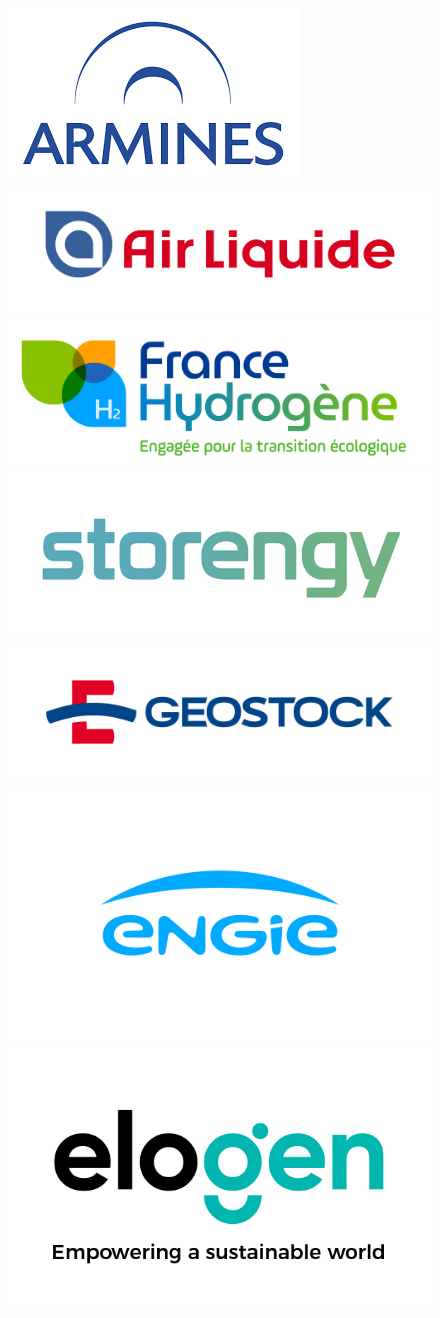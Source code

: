 \documentclass[11pt,french,a4paper]{article}
\begin{document}
\begin{figure}[!h]
	\includegraphics[width=.30\textwidth]{image/frontpage/logo_ARMINES.PNG}\hfill	
	\includegraphics[width=.30\textwidth]{image/frontpage/logo_air_liquide.jpg} \hfill
	\includegraphics[width=.30\textwidth]{image/frontpage/logo_franceH2.jpg}\hfill
	\\[\smallskipamount]
	\includegraphics[width=.24\textwidth]{image/frontpage/logo_storengy.jpg} \hfill
	\includegraphics[width=.24\textwidth]{image/frontpage/logo_geostock.jpg} \hfill
	\includegraphics[width=.24\textwidth]{image/frontpage/logo_ENGIE.PNG} \hfill
	\includegraphics[width=.24\textwidth]{image/frontpage/logo_elogen.jpg} \hfill
	
\end{figure}
\end{document}
